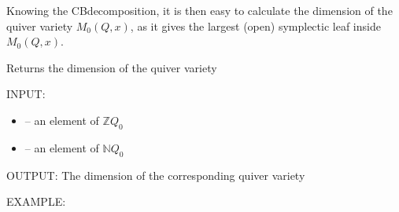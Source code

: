 \documentclass[letterpaper,10pt,english]{sphinxmanual}
\begin{document}
\sphinxAtStartPar
Knowing the CB\sphinxhyphen{}decomposition, it is then easy to calculate the dimension of the quiver variety \(M_0(Q,x)\), as it gives the largest (open) symplectic leaf inside \(M_0(Q,x)\).

\begin{fulllineitems}
\label{\detokenize{index:quivercombinatorics.quivercombinatorics.Quiver.quiver_variety_dimension}}
\pysigstartsignatures
\pysiglinewithargsret
{}
{\sphinxparamcomma {}}
{}
\pysigstopsignatures
\sphinxAtStartPar
Returns the dimension of the quiver variety

\sphinxAtStartPar
INPUT:
\begin{itemize}
\item {} 
\sphinxAtStartPar
{} – an element of \(\mathbb{Z}Q_0\)

\item {} 
\sphinxAtStartPar
{} – an element of \(\mathbb{N}Q_0\)

\end{itemize}

\sphinxAtStartPar
OUTPUT: The dimension of the corresponding quiver variety

\sphinxAtStartPar
EXAMPLE:

\begin{sphinxVerbatim}[commandchars=\\\{\}]
  
   \PYG{p}{[}\PYG{p}{[} \PYG{p}{]} \PYG{p}{[} \PYG{p}{]}\PYG{p}{]}
    
\end{sphinxVerbatim}

\end{fulllineitems}
\end{document}
